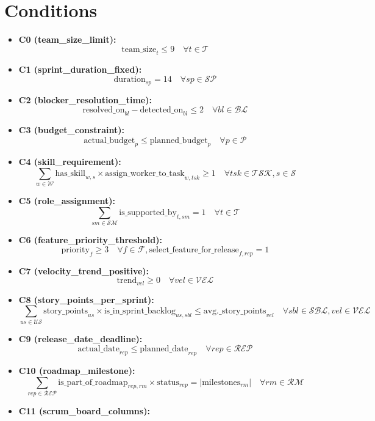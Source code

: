 \documentclass{article}
\begin{document}
\section{Conditions}
\begin{itemize}
    \item \textbf{C0 (team\_size\_limit):}
    \[
    \text{team\_size}_t \leq 9 \quad \forall t \in \mathcal{T}
    \]
    \item \textbf{C1 (sprint\_duration\_fixed):}
    \[
    \text{duration}_{sp} = 14 \quad \forall sp \in \mathcal{SP}
    \]
    \item \textbf{C2 (blocker\_resolution\_time):}
    \[
    \text{resolved\_on}_{bl} - \text{detected\_on}_{bl} \leq 2 \quad \forall bl \in \mathcal{BL}
    \]
    \item \textbf{C3 (budget\_constraint):}
    \[
    \text{actual\_budget}_p \leq \text{planned\_budget}_p \quad \forall p \in \mathcal{P}
    \]
    \item \textbf{C4 (skill\_requirement):}
    \[
    \sum_{w \in \mathcal{W}} \text{has\_skill}_{w,s} \times \text{assign\_worker\_to\_task}_{w,tsk} \geq 1 \quad \forall tsk \in \mathcal{TSK}, s \in \mathcal{S}
    \]
    \item \textbf{C5 (role\_assignment):}
    \[
    \sum_{sm \in \mathcal{SM}} \text{is\_supported\_by}_{t,sm} = 1 \quad \forall t \in \mathcal{T}
    \]
    \item \textbf{C6 (feature\_priority\_threshold):}
    \[
    \text{priority}_f \geq 3 \quad \forall f \in \mathcal{F}, \text{select\_feature\_for\_release}_{f,rep} = 1
    \]
    \item \textbf{C7 (velocity\_trend\_positive):}
    \[
    \text{trend}_{vel} \geq 0 \quad \forall vel \in \mathcal{VEL}
    \]
    \item \textbf{C8 (story\_points\_per\_sprint):}
    \[
    \sum_{us \in \mathcal{US}} \text{story\_points}_{us} \times \text{is\_in\_sprint\_backlog}_{us,sbl} \leq \text{avg.\_story\_points}_{vel} \quad \forall sbl \in \mathcal{SBL}, vel \in \mathcal{VEL}
    \]
    \item \textbf{C9 (release\_date\_deadline):}
    \[
    \text{actual\_date}_{rep} \leq \text{planned\_date}_{rep} \quad \forall rep \in \mathcal{REP}
    \]
    \item \textbf{C10 (roadmap\_milestone):}
    \[
    \sum_{rep \in \mathcal{REP}} \text{is\_part\_of\_roadmap}_{rep,rm} \times \text{status}_{rep} = |\text{milestones}_{rm}| \quad \forall rm \in \mathcal{RM}
    \]
    \item \textbf{C11 (scrum\_board\_columns):}

\end{itemize}
\end{document}

